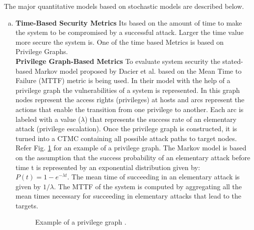 \documentclass[pdftex,english,oribibl]{llncs}
\begin{document}
The major quantitative models based on stochastic models are described below.
\begin{enumerate}[(a)]
	\item {\textbf{Time-Based Security Metrics}\newline 
	Its based on the amount of time to make the system to be compromised by a successful attack. Larger the time value more secure the system is. One of the time based Metrics is based on Privilege Graphs.\\
    \textbf{Privilege Graph-Based Metrics}\newline 
	To evaluate system security the stated-based Markov model proposed by Dacier et al. \cite{Dacier1996QuantitativeAO} based on the Mean Time to Failure (MTTF) metric is being used. In their model with the help of a privilege graph the vulnerabilities of a system is represented. In this graph nodes represent the access rights (privileges) at hosts and arcs represent the actions that enable the transition from one privilege to another. Each arc is labeled with a value ($\lambda$) that represents the success rate of an elementary attack (privilege escalation). Once the privilege graph is constructed, it is turned into a CTMC containing all possible attack paths to target nodes. Refer Fig. \ref{fig:privilege_graph_example} for an example of a privilege graph.  The Markov model is based on the assumption that the success probability of an elementary attack before time t is represented by an exponential distribution given by: $P(t) = 1 - e^{-\lambda t}$. The mean time of succeeding in an elementary attack is given by $1/\lambda$. The MTTF of the system is computed by aggregating all the mean times necessary for succeeding in elementary attacks that lead to the targets.\\
		
	\begin{figure}[h]
		\centering
		\caption{Example of a privilege graph \cite{Dacier1996QuantitativeAO}.}
		\label{fig:privilege_graph_example}
	\end{figure}
		
}
\end{enumerate}
\end{document}

